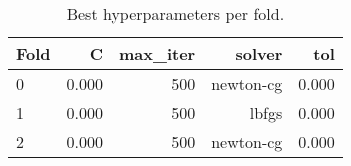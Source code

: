 \begin{table}
\caption{Best hyperparameters per fold.}
\label{tab:hyperparams}
\begin{tabular}{lrrrr}
\toprule
Fold & C & max\_iter & solver & tol \\
\midrule
0 & 0.000 & 500 & newton-cg & 0.000 \\
1 & 0.000 & 500 & lbfgs & 0.000 \\
2 & 0.000 & 500 & newton-cg & 0.000 \\
\bottomrule
\end{tabular}
\end{table}
